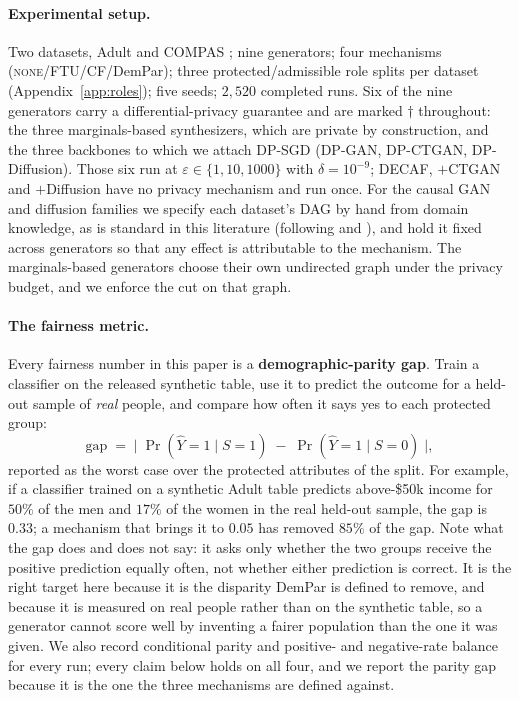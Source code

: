\documentclass[manuscript,screen,review]{acmart}
\begin{document}
\paragraph{Experimental setup.}
Two datasets, Adult \citep{becker1996adult} and COMPAS
\citep{angwin2016machinebias}; nine generators; four mechanisms
(\textsc{none}/FTU/CF/DemPar); three protected/admissible role splits per
dataset (Appendix~\ref{app:roles}); five seeds; $2{,}520$ completed runs. Six of
the nine generators carry a differential-privacy guarantee
\citep{dwork2006calibrating} and are marked $\dagger$ throughout: the three
marginals-based synthesizers, which are private by construction, and the three
backbones to which we attach DP-SGD (DP-GAN, DP-CTGAN, DP-Diffusion). Those
six run at $\varepsilon \in \{1,10,1000\}$ with $\delta = 10^{-9}$; DECAF,
$+$CTGAN and $+$Diffusion have no privacy mechanism and run once. For the
causal GAN and diffusion families we specify each dataset's DAG by hand from
domain knowledge, as is standard in this literature (following
\citet{kusner2017counterfactual} and \citet{zhang2017causalframework}), and
hold it fixed across generators so that any effect is attributable to the
mechanism. The marginals-based generators choose their own undirected graph
under the privacy budget, and we enforce the cut on that graph.

\paragraph{The fairness metric.}
Every fairness number in this paper is a \textbf{demographic-parity gap}.
Train a classifier on the released synthetic table, use it to predict the
outcome for a held-out sample of \emph{real} people, and compare how often it
says yes to each protected group:
\[
  \mathrm{gap} \;=\; \bigl|\;\Pr(\hat{Y}{=}1 \mid S{=}1)\;-\;\Pr(\hat{Y}{=}1 \mid S{=}0)\;\bigr| ,
\]
reported as the worst case over the protected attributes of the split. For
example, if a classifier trained on a synthetic Adult table predicts
above-\$50k income for $50\%$ of the men and $17\%$ of the women in the real
held-out sample, the gap is $0.33$; a mechanism that brings it to $0.05$ has
removed $85\%$ of the gap. Note what the gap does and does not say: it asks
only whether the two groups receive the positive prediction equally often, not
whether either prediction is correct. It is the right target here because it
is the disparity DemPar is defined to remove, and because it is measured on
real people rather than on the synthetic table, so a generator cannot score
well by inventing a fairer population than the one it was given. We also
record conditional parity and positive- and negative-rate balance for every
run; every claim below holds on all four, and we report the parity gap because
it is the one the three mechanisms are defined against.
\end{document}
